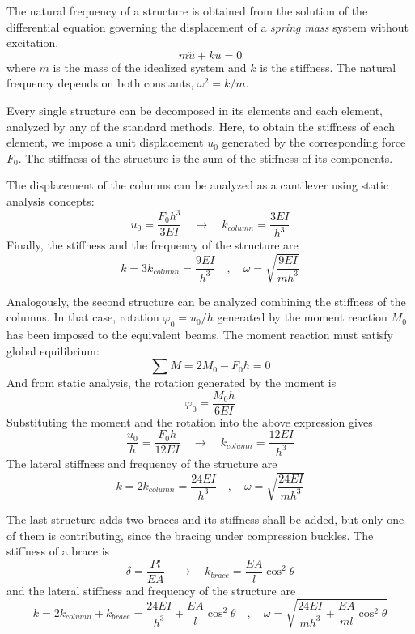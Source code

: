 \documentclass{problems}
\begin{document}
The natural frequency of a structure is obtained from the solution of the differential equation governing the displacement of a \emph{spring mass} system without excitation.
$$
m\ddot{u}+ku=0
$$
where $m$ is the mass of the idealized system and $k$ is the stiffness. The natural frequency depends on both constants, $\omega^2 = k/m$.

Every single structure can be decomposed in its elements and each element, analyzed by any of the standard methods. Here, to obtain the stiffness of each element, we impose a unit displacement $u_0$ generated by the corresponding force $F_0$. The stiffness of the structure is the sum of the stiffness of its components.

\begin{center}
\end{center}

The displacement of the columns can be analyzed as a cantilever using static analysis concepts:
$$
u_0 = \frac{F_0h^3}{3EI} \quad \rightarrow \quad k_{column} = \frac{3EI}{h^3}
$$
Finally, the stiffness and the frequency of the structure are
$$
k = 3k_{column} = \frac{9EI}{h^3} \quad , \quad \omega = \sqrt{\frac{9EI}{mh^3}}
$$

\begin{center}
\end{center}

Analogously, the second structure can be analyzed combining the stiffness of the columns. In that case, rotation $\varphi_0 = u_0/h$ generated by the moment reaction $M_0$ has been imposed to the equivalent beams. The moment reaction must satisfy global equilibrium:
$$
\sum M = 2M_0 -F_0h = 0
$$
And from static analysis, the rotation generated by the moment is
$$
\varphi_0 = \frac{M_0h}{6EI}
$$
Substituting the moment and the rotation into the above expression gives
$$
\frac{u_0}{h} = \frac{F_0h}{12EI} \quad \rightarrow \quad k_{column} = \frac{12EI}{h^3}
$$
The lateral stiffness and frequency of the structure are
$$
k = 2k_{column} = \frac{24EI}{h^3} \quad , \quad \omega = \sqrt{\frac{24EI}{mh^3}}
$$

\begin{center}
\end{center}

The last structure adds two braces and its stiffness shall be added, but only one of them is contributing, since the bracing under compression buckles. The stiffness of a brace is
$$
\delta = \frac{Pl}{EA} \quad \rightarrow \quad k_{brace} = \frac{EA}{l}\cos^2\theta
$$
and the lateral stiffness and frequency of the structure are
$$
k = 2k_{column} + k_{brace} = \frac{24EI}{h^3}+\frac{EA}{l}\cos^2\theta \quad , \quad 
\omega = \sqrt{\frac{24EI}{mh^3}+\frac{EA}{ml}\cos^2\theta}
$$
\end{document}
